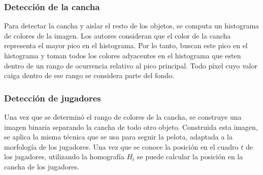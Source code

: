 \documentclass[a4paper,10pt]{article}
\begin{document}
\subsubsection*{Detección de la cancha}

Para detectar la cancha y aislar el resto de los objetos, se computa un histograma de colores de la imagen.
Los autores consideran que el color de la cancha representa el mayor pico en el histograma.
Por lo tanto, buscan este pico en el histograma y toman todos los colores adyacentes en el histograma que esten dentro de un rango de ocurrencia relativo al pico principal.
Todo píxel cuyo valor caiga dentro de ese rango se considera parte del fondo.

\subsubsection*{Detección de jugadores}

Una vez que se determinó el rango de colores de la cancha, se construye una imagen binaria separando la cancha de todo otro objeto.
Construida esta imagen, se aplica la misma técnica que se usa para seguir la pelota, adaptada a la morfología de los jugadores.
Una vez que se conoce la posición en el cuadro $t$ de los jugadores, utilizando la homografía $H_t$ se puede calcular la posición
en la cancha de los jugadores.

\printbibliography
\end{document}
